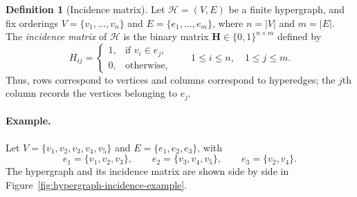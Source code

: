 \documentclass{article}
\theoremstyle{definition}
\newtheorem{definition}{Definition}
\theoremstyle{plain}
\begin{document}
\begin{definition}[Incidence matrix]
\label{def:incidence-matrix}
Let $\mathcal{H}=(V,E)$ be a finite hypergraph, and fix orderings
$V=\{v_1,\ldots,v_n\}$ and $E=\{e_1,\ldots,e_m\}$, where
$n=|V|$ and $m=|E|$. The \emph{incidence matrix} of $\mathcal{H}$ is
the binary matrix $\mathbf{H}\in\{0,1\}^{n\times m}$ defined by
\[
  H_{ij} =
  \begin{cases}
    1, & \text{if } v_i\in e_j,\\
    0, & \text{otherwise},
  \end{cases}
  \qquad 1\leq i\leq n,\quad 1\leq j\leq m.
\]
Thus, rows correspond to vertices and columns correspond to hyperedges;
the $j$th column records the vertices belonging to $e_j$.
\end{definition}

\paragraph{Example.}
Let $V=\{v_1,v_2,v_3,v_4,v_5\}$ and $E=\{e_1,e_2,e_3\}$, with
\[
  e_1=\{v_1,v_2,v_3\},\qquad
  e_2=\{v_3,v_4,v_5\},\qquad
  e_3=\{v_2,v_4\}.
\]
The hypergraph and its incidence matrix are shown side by side in
Figure~\ref{fig:hypergraph-incidence-example}.
\end{document}
